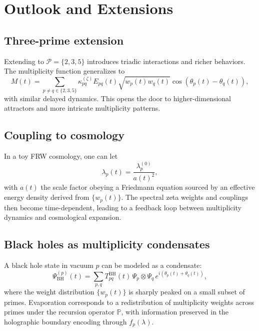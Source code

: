 \documentclass[11pt]{article}
\begin{document}
\section{Outlook and Extensions}

\subsection{Three-prime extension}

Extending to \(\mathcal{P} = \{2,3,5\}\) introduces triadic interactions and richer behaviors.
The multiplicity function generalizes to
\begin{equation}
  M(t)
  =
  \sum_{p\ne q \in\{2,3,5\}}
  \kappa_{pq}^{(\zeta)} E_{pq}(t)
  \sqrt{w_p(t) w_q(t)}
  \cos(\theta_p(t) - \theta_q(t)),
\end{equation}
with similar delayed dynamics.
This opens the door to higher-dimensional attractors and more intricate multiplicity patterns.

\subsection{Coupling to cosmology}

In a toy FRW cosmology, one can let
\begin{equation}
  \lambda_p(t) = \frac{\lambda_p^{(0)}}{a(t)^2},
\end{equation}
with \(a(t)\) the scale factor obeying a Friedmann equation sourced by an effective energy density derived from \(\{w_p(t)\}\).
The spectral zeta weights and couplings then become time-dependent, leading to a feedback loop between multiplicity dynamics and cosmological expansion.

\subsection{Black holes as multiplicity condensates}

A black hole state in vacuum \(p\) can be modeled as a condensate:
\begin{equation}
  \Psi_{\mathrm{BH}}^{(p)}(t)
  =
  \sum_{p,q}
  T_{pq}^{\mathrm{BH}}(t)\, \Psi_p \otimes \Psi_q\,
  e^{i(\theta_p(t) + \theta_q(t))},
\end{equation}
where the weight distribution \(\{w_p(t)\}\) is sharply peaked on a small subset of primes.
Evaporation corresponds to a redistribution of multiplicity weights across primes under the recursion operator \(\mathbb{P}\), with information preserved in the holographic boundary encoding through \(f_p(\lambda)\).
\end{document}
